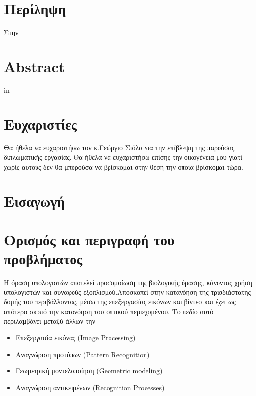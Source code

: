 \documentclass[12pt]{article}
\numberwithin{equation}{section}
\begin{document}
\newpage
\mbox{}
\newpage

\section*{Περίληψη}
Στην


\newpage
\mbox{}
\newpage

\section*{Abstract}
in



\newpage
\mbox{}
\newpage

\section*{Ευχαριστίες}
Θα ήθελα να ευχαριστήσω τον κ.Γεώργιο Σιόλα για την επίβλεψη της παρούσας διπλωματικής εργασίας. Θα ήθελα να ευχαριστήσω επίσης την οικογένεια μου γιατί χωρίς αυτούς δεν θα μπορούσα να βρίσκομαι στην θέση την οποία βρίσκομαι τώρα.


\newpage
\mbox{}
\newpage


\tableofcontents

\newpage
\listoffigures
{}

\newpage
\listoftables
{}

\newpage
{}


\section{Εισαγωγή}

\newpage

\section{Ορισμός και περιγραφή του προβλήματος}

Η όραση υπολογιστών αποτελεί προσομοίωση της βιολογικής όρασης, κάνοντας χρήση υπολογιστών και συναφούς εξοπλισμού.Αποσκοπεί στην κατανόηση της τρισδιάστατης δομής του περιβάλλοντος, μέσω της επεξεργασίας εικόνων και βίντεο και έχει ως απότερο σκοπό την κατανόηση του οπτικού περιεχομένου. Το πεδίο αυτό περιλαμβάνει μεταξύ άλλων την

\begin{itemize}
    \item Επεξεργασία εικόνας (Image Processing)
    \item Αναγνώριση προτύπων (Pattern Recognition)
    \item Γεωμετρική μοντελοποίηση (Geometric modeling)
    \item Αναγνώριση αντικειμένων (Recognition Processes)
\end{itemize}
\end{document}
